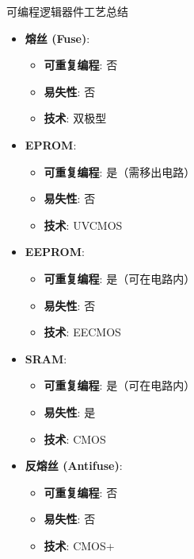 \documentclass[
  ignorenonframetext,
  chinese,
]{beamer}
\providecommand{\tightlist}{%
  \setlength{\itemsep}{0pt}\setlength{\parskip}{0pt}}
\begin{document}
\begin{frame}
\begin{block}{可编程逻辑器件工艺总结}
\label{ux53efux7f16ux7a0bux903bux8f91ux5668ux4ef6ux5de5ux827aux603bux7ed3}
\begin{itemize}
\tightlist
\item
  \textbf{熔丝 (Fuse)}:

  \begin{itemize}
  \tightlist
  \item
    \textbf{可重复编程}: 否
  \item
    \textbf{易失性}: 否
  \item
    \textbf{技术}: 双极型
  \end{itemize}
\item
  \textbf{EPROM}:

  \begin{itemize}
  \tightlist
  \item
    \textbf{可重复编程}: 是（需移出电路）
  \item
    \textbf{易失性}: 否
  \item
    \textbf{技术}: UVCMOS
  \end{itemize}
\item
  \textbf{EEPROM}:

  \begin{itemize}
  \tightlist
  \item
    \textbf{可重复编程}: 是（可在电路内）
  \item
    \textbf{易失性}: 否
  \item
    \textbf{技术}: EECMOS
  \end{itemize}
\item
  \textbf{SRAM}:

  \begin{itemize}
  \tightlist
  \item
    \textbf{可重复编程}: 是（可在电路内）
  \item
    \textbf{易失性}: 是
  \item
    \textbf{技术}: CMOS
  \end{itemize}
\item
  \textbf{反熔丝 (Antifuse)}:

  \begin{itemize}
  \tightlist
  \item
    \textbf{可重复编程}: 否
  \item
    \textbf{易失性}: 否
  \item
    \textbf{技术}: CMOS+
  \end{itemize}
\end{itemize}
\end{block}
\end{frame}
\end{document}
